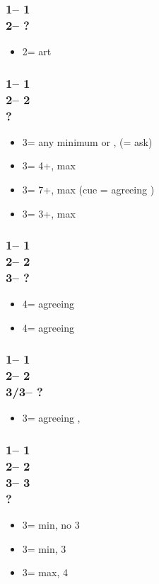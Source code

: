 \documentclass[12pt, a4paper]{article}
\begin{document}
\subsubsection*{1\hearts -- 1\spades\\
                2\hearts -- ?}
\begin{itemize}
    \item 2\nt = \invp art \vimp
\end{itemize}

\subsubsection*{1\hearts -- 1\spades\\
                2\hearts -- 2\nt\\
                ?}
\begin{itemize}
    \item 3\clubs = any minimum or \nat, \forc (\diams = ask) \vimp
    \item 3\diams = 4+\diams, max
    \item 3\hearts = 7+\hearts, max (cue = agreeing \hearts)
    \item 3\spades = 3+\spades, max
\end{itemize}

\subsubsection*{1\hearts -- 1\spades\\
                2\hearts -- 2\nt\\
                3\spades -- ?}
\begin{itemize}
    \item 4\clubs = agreeing \hearts
    \item 4\diams = agreeing \spades
\end{itemize}

\subsubsection*{1\hearts -- 1\spades\\
                2\hearts -- 2\nt\\
                3\clubs/3\diams -- ?}
\begin{itemize}
    \item 3\spades = agreeing \spades, \gf
\end{itemize}

\subsubsection*{1\hearts -- 1\spades\\
                2\hearts -- 2\nt\\
                3\clubs -- 3\diams\\
                ?}
\begin{itemize}
    \item 3\hearts = min, no 3\spades
    \item 3\spades = min, 3\spades
    \item 3\nt = max, 4\clubs
\end{itemize}
\end{document}
